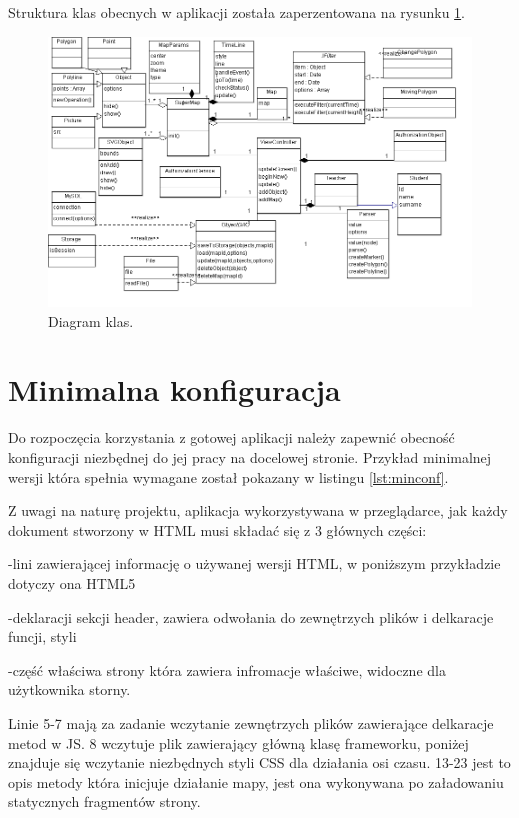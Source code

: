 Struktura klas obecnych w aplikacji została zaperzentowana na rysunku \ref{fig:classDiagram2}.

\begin{center}
\begin{figure}[H]
\centering
     \includegraphics[angle=270,origin=c,width=130mm]{ge/smieci/ClassDiagram.png}
      \caption{Diagram klas.}
       \label{fig:classDiagram2}
\end{figure}
\end{center}

\section{Minimalna konfiguracja}
\label{sec:minimum}

Do rozpoczęcia korzystania z gotowej aplikacji należy zapewnić obecność konfiguracji niezbędnej do jej pracy na docelowej stronie. Przykład minimalnej wersji która spełnia wymagane został pokazany w listingu \ref{lst:minconf}.

Z uwagi na naturę projektu, aplikacja wykorzystywana w przeglądarce, jak każdy dokument stworzony w HTML musi składać się z 3 głównych części:


-lini zawierającej informację o używanej wersji HTML, w poniższym przykładzie dotyczy ona HTML5

-deklaracji sekcji header, zawiera odwołania do zewnętrzych plików i delkaracje funcji, styli

-część właściwa strony która zawiera infromacje właściwe, widoczne dla użytkownika storny.

Linie 5-7 mają za zadanie wczytanie zewnętrzych plików zawierające delkaracje metod w JS. 8 wczytuje plik zawierający główną klasę frameworku, poniżej znajduje się wczytanie niezbędnych styli CSS dla działania osi czasu. 13-23 jest to opis metody która inicjuje działanie mapy, jest ona wykonywana po załadowaniu statycznych fragmentów strony.

